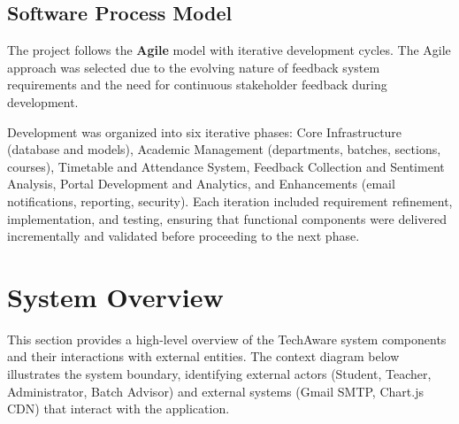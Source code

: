\subsection{Software Process Model}

The project follows the \textbf{Agile} model with iterative development cycles. The Agile approach was selected due to the evolving nature of feedback system requirements and the need for continuous stakeholder feedback during development.

Development was organized into six iterative phases: Core Infrastructure (database and models), Academic Management (departments, batches, sections, courses), Timetable and Attendance System, Feedback Collection and Sentiment Analysis, Portal Development and Analytics, and Enhancements (email notifications, reporting, security). Each iteration included requirement refinement, implementation, and testing, ensuring that functional components were delivered incrementally and validated before proceeding to the next phase.

\section{System Overview}

This section provides a high-level overview of the TechAware system components and their interactions with external entities. The context diagram below illustrates the system boundary, identifying external actors (Student, Teacher, Administrator, Batch Advisor) and external systems (Gmail SMTP, Chart.js CDN) that interact with the application.

